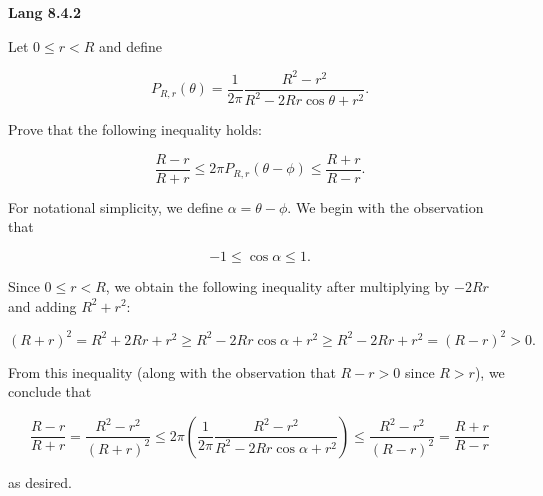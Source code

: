 \textbf{Lang 8.4.2}

Let $0 \le r < R$ and define

$$
P_{R, r}(\theta) = \frac{1}{2 \pi} \frac{R^2 - r^2}{R^2 - 2 R r \cos{\theta} + r^2}.
$$

Prove that the following inequality holds:

$$
\frac{R - r}{R + r} \le 2 \pi P_{R, r}(\theta - \phi) \le \frac{R + r}{R - r}.
$$

\begin{solution}
  For notational simplicity, we define $\alpha = \theta - \phi$. We begin with the observation that 

  $$
  -1 \le \cos{\alpha} \le 1.
  $$

  Since $0 \le r < R$, we obtain the following inequality after multiplying by $-2 R r$ and adding $R^2 + r^2$:

  $$
  (R + r)^2 = R^2 + 2 R r + r^2 
            \ge R^2 - 2 R r \cos{\alpha} + r^2 
            \ge R^2 - 2 R r + r^2 
            = (R - r)^2 > 0.
  $$

  From this inequality (along with the observation that $R - r > 0$ since $R > r$), we conclude that

  $$
  \frac{R - r}{R + r} = \frac{R^2 - r^2}{(R + r)^2} 
                      \le 2 \pi \left(\frac{1}{2 \pi} \frac{R^2 - r^2}{R^2 - 2 R r \cos{\alpha} + r^2} \right)
                      \le \frac{R^2 - r^2}{(R - r)^2} 
                      = \frac{R + r}{R - r}
  $$

  as desired.
  \ \\
\end{solution}
